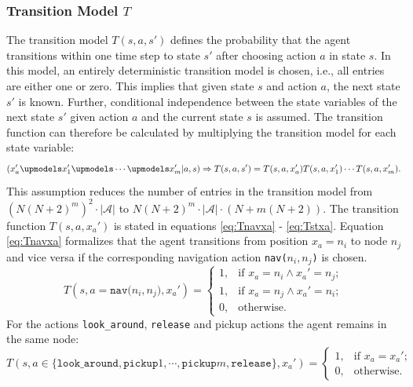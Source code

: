 \subsubsection{Transition Model $T$}
The transition model $T(s, a, s')$ defines the probability that the agent transitions within one time step to state $s'$ after choosing action $a$ in state $s$. In this model, an entirely deterministic transition model is chosen, i.e., all entries are either one or zero. This implies that given state $s$ and action $a$, the next state $s'$ is known. Further, conditional independence between the state variables of the next state $s'$ given action $a$ and the current state $s$ is assumed. The transition function can therefore be calculated by multiplying the transition model for each state variable:
\begin{equation}
    \left(x_a' \upmodels x_1' \upmodels \cdots \upmodels x_m' |a, s\right) \Rightarrow T(s,a,s') = T(s,a, x_a') T(s,a,x_1') \cdots T(s,a,x_m').
\end{equation}
This assumption reduces the number of entries in the transition model from \\$\left(N(N+2)^m\right)^2\cdot|\mathcal{A}|$ to $N(N+2)^m\cdot|\mathcal{A}|\cdot (N+m(N+2))$. The transition function $T(s, a, x_a')$ is stated in equations \ref{eq:Tnavxa} - \ref{eq:Tstxa}. Equation \ref{eq:Tnavxa} formalizes that the agent transitions from position $x_a=n_i$ to node $n_j$ and vice versa if the corresponding navigation action \texttt{nav($n_i,n_j$)} is chosen.
\begin{equation}\label{eq:Tnavxa}
    T(s, a=\texttt{nav($n_i, n_j$)}, x_a') = \begin{cases}
             1, & \text{if }x_a=n_i \land x_a'=n_j;\\
             1, & \text{if }x_a=n_j \land x_a'=n_i;\\
             0, & \text{otherwise}.
         \end{cases}
\end{equation}
For the actions \texttt{look\_around}, \texttt{release} and pickup actions the agent remains in the same node: 
\begin{equation}
    T(s,a\in\{\texttt{look\_around}, \texttt{pickup}1,\cdots,\texttt{pickup}m, \texttt{release}\}, x_a') = 
    \begin{cases}
        1, & \text{if }x_a=x_a'; \\
        0, & \text{otherwise}.
    \end{cases}
\end{equation}
